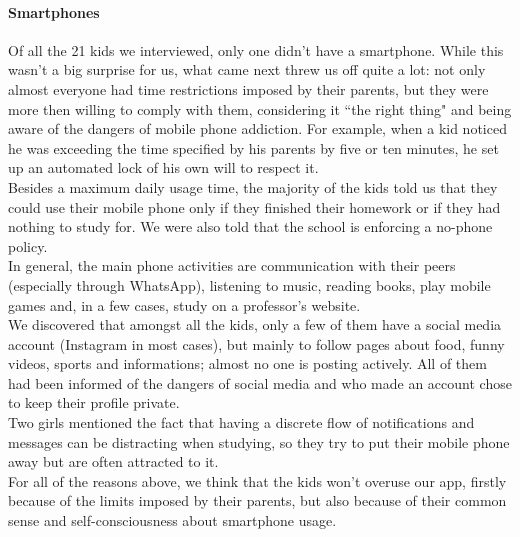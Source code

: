 \documentclass[12pt]{scrartcl}
\begin{document}
		\paragraph{Smartphones} Of all the 21 kids we interviewed, only one didn't have a smartphone. While this wasn't a big surprise for us, what came next threw us off quite a lot: not only almost everyone had time restrictions imposed by their parents, but they were more then willing to comply with them, considering it ``the right thing" and being aware of the dangers of mobile phone addiction. For example, when a kid noticed he was exceeding the time specified by his parents by five or ten minutes, he set up an automated lock of his own will to respect it.\\
		Besides a maximum daily usage time, the majority of the kids told us that they could use their mobile phone only if they finished their homework or if they had nothing to study for. We were also told that the school is enforcing a no-phone policy.\\
		In general, the main phone activities are communication with their peers (especially through WhatsApp), listening to music, reading books, play mobile games and, in a few cases, study on a professor's website.\\
		We discovered that amongst all the kids, only a few of them have a social media account (Instagram in most cases), but mainly to follow pages about food, funny videos, sports and informations; almost no one is posting actively. All of them had been informed of the dangers of social media and who made an account chose to keep their profile private.\\
		Two girls mentioned the fact that having a discrete flow of notifications and messages can be distracting when studying, so they try to put their mobile phone away but are often attracted to it.\\
		For all of the reasons above, we think that the kids won't overuse our app, firstly because of the limits imposed by their parents, but also because of their common sense and self-consciousness about smartphone usage.
		
\end{document}
